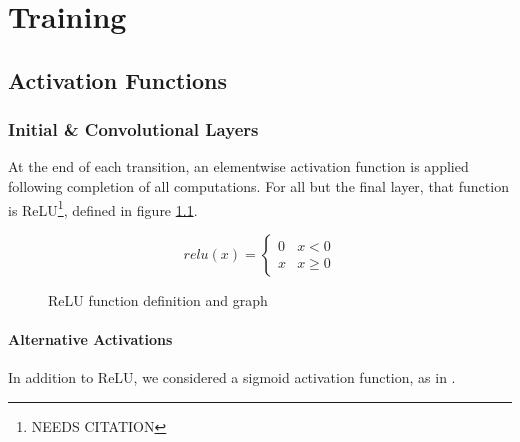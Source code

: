 \chapter{Training}


\section{Activation Functions}
\label{sec:activation}
\subsection{Initial \& Convolutional Layers}
At the end of each transition, an elementwise activation function is applied 
following completion of all computations.  For all but the final layer, that 
function is ReLU\footnote{NEEDS CITATION}, defined in figure \ref{fig:relu}.

\begin{figure}[h]
	\centering
	\begin{minipage}{.48\textwidth}
		\begin{equation*}
			relu(x) = \begin{cases}
				0 & x < 0\\
				x & x \geq 0
			\end{cases}
		\end{equation*}
	\end{minipage}
	\begin{minipage}{.48\textwidth}
	\end{minipage}
	\caption{ReLU function definition and graph}
	\label{fig:relu}
\end{figure}\noindent

\subsubsection{Alternative Activations}
In addition to ReLU, we considered a sigmoid activation function, as in 
.

